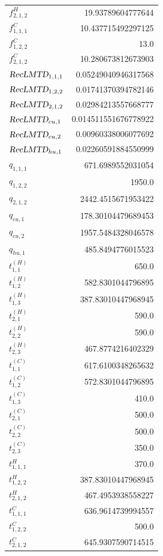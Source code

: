 \documentclass{article}%
\begin{document}
\begin{multicols*}{3}
\begin{supertabular}{lr}
	$f_{2,1,2}^{H}$ & 19.93789604777644 \\%
	$f_{1,1,1}^{C}$ & 10.437715492297125 \\%
	$f_{1,2,2}^{C}$ & 13.0 \\%
	$f_{2,1,2}^{C}$ & 10.280673812673903 \\%
	$\textsl{RecLMTD}_{1,1,1}$ & 0.05249040946317568 \\%
	$\textsl{RecLMTD}_{1,2,2}$ & 0.01741370394782146 \\%
	$\textsl{RecLMTD}_{2,1,2}$ & 0.02984213557668777 \\%
	$\textsl{RecLMTD}_{cu,1}$ & 0.014511551676778922 \\%
	$\textsl{RecLMTD}_{cu,2}$ & 0.00960338006077692 \\%
	$\textsl{RecLMTD}_{hu,1}$ & 0.02260591884550999 \\%
	$q_{1,1,1}$ & 671.6989552031054 \\%
	$q_{1,2,2}$ & 1950.0 \\%
	$q_{2,1,2}$ & 2442.4515671953422 \\%
	$q_{cu,1}$ & 178.30104479689453 \\%
	$q_{cu,2}$ & 1957.5484328046578 \\%
	$q_{hu,1}$ & 485.8494776015523 \\%
	$t_{1,1}^{(H)}$ & 650.0 \\%
	$t_{1,2}^{(H)}$ & 582.8301044796895 \\%
	$t_{1,3}^{(H)}$ & 387.83010447968945 \\%
	$t_{2,1}^{(H)}$ & 590.0 \\%
	$t_{2,2}^{(H)}$ & 590.0 \\%
	$t_{2,3}^{(H)}$ & 467.8774216402329 \\%
	$t_{1,1}^{(C)}$ & 617.6100348265632 \\%
	$t_{1,2}^{(C)}$ & 572.8301044796895 \\%
	$t_{1,3}^{(C)}$ & 410.0 \\%
	$t_{2,1}^{(C)}$ & 500.0 \\%
	$t_{2,2}^{(C)}$ & 500.0 \\%
	$t_{2,3}^{(C)}$ & 350.0 \\%
	$t_{1,1,1}^{H}$ & 370.0 \\%
	$t_{1,2,2}^{H}$ & 387.83010447968945 \\%
	$t_{2,1,2}^{H}$ & 467.4953938558227 \\%
	$t_{1,1,1}^{C}$ & 636.9614739994557 \\%
	$t_{1,2,2}^{C}$ & 500.0 \\%
	$t_{2,1,2}^{C}$ & 645.9307590714515 \\%

\end{supertabular}
\end{multicols*}
\end{document}
